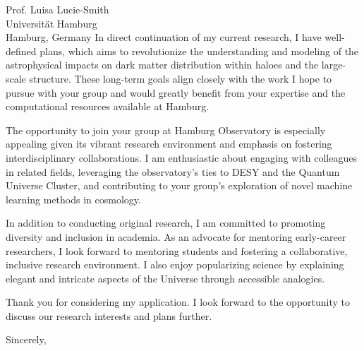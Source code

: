 \documentclass[11pt]{letter}
\begin{document}
\begin{letter}{Prof. Luisa Lucie-Smith \\ Universität Hamburg \\ Hamburg, Germany}
In direct continuation of my current research, I have well-defined plans, which aims to revolutionize the understanding and modeling of the astrophysical impacts on dark matter distribution within haloes and the large-scale structure. These long-term goals align closely with the work I hope to pursue with your group and would greatly benefit from your expertise and the computational resources available at Hamburg.

The opportunity to join your group at Hamburg Observatory is especially appealing given its vibrant research environment and emphasis on fostering interdisciplinary collaborations. I am enthusiastic about engaging with colleagues in related fields, leveraging the observatory's ties to DESY and the Quantum Universe Cluster, and contributing to your group's exploration of novel machine learning methods in cosmology.

In addition to conducting original research, I am committed to promoting diversity and inclusion in academia. As an advocate for mentoring early-career researchers, I look forward to mentoring students and fostering a collaborative, inclusive research environment. I also enjoy popularizing science by explaining elegant and intricate aspects of the Universe through accessible analogies.

Thank you for considering my application. I look forward to the opportunity to discuss our research interests and plans further.

\closing{Sincerely,}

\end{letter}
\end{document}
